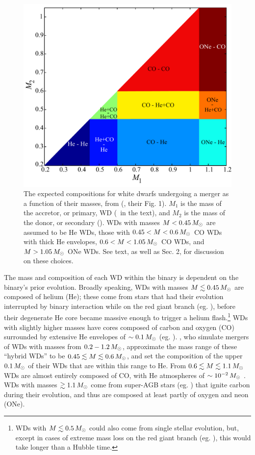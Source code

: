 \begin{figure}
\centering
\includegraphics[width=0.6\hsize]{introduction/figures/dan+12_wdbinmass.pdf}
\caption{The expected compositions for white dwarfs undergoing a merger as a function of their masses, from \citeauthor{dan+12} (\citeyear{dan+12}, their Fig. 1).  $M_1$ is the mass of the accretor, or primary, WD (\Ma\ in the text), and $M_2$ is the mass of the donor, or secondary (\Md).  WDs with masses $M<0.45\,\Msun$ are assumed to be He WDs, those with $0.45 < M < 0.6\,\Msun$ CO WDs with thick He envelopes, $0.6 < M < 1.05\,\Msun$ CO WDs, and $M>1.05\,\Msun$ ONe WDs.  See text, as well as \cite{dan+12} Sec. 2, for discussion on these choices.}
\label{fig:c1_wdbinarymasses}
\end{figure}


The mass and composition of each WD within the binary is dependent on the binary's prior evolution.  Broadly speaking, WDs with masses $M \lesssim 0.45\,\Msun$ are composed of helium (He); these come from stars that had their evolution interrupted by binary interaction while on the red giant branch {\charles (eg. \citealt{mars95, nele+01a, podsrp02, nelsdm04}), before their degenerate He core became massive enough to trigger a helium flash.\footnote{{\charles WDs with $M\lesssim0.5\,\Msun$ could also come from single stellar evolution, but, except in cases of extreme mass loss on the red giant branch (eg. \citealt{kali+07}), this would take longer than a Hubble time.}}  WDs with slightly higher masses have cores composed of carbon and oxygen (CO) surrounded by extensive He envelopes of $\sim0.1\,\Msun$ (eg. \citealt{ibent85, nele+01a, podsrp02}).  \cite{dan+12}, who simulate mergers of WDs with masses from $0.2 - 1.2\,\Msun$, approximate the mass range of these ``hybrid WDs'' to be $0.45 \lesssim M \lesssim 0.6\,\Msun$, and set the composition of the upper $0.1\,\Msun$ of their WDs that are within this range to He.}  From $0.6 \lesssim M \lesssim 1.1\,\Msun$ WDs are almost entirely composed of CO, with He atmospheres of $\sim10^{-2}\,\Msun$ \citep{ibent85}.  WDs with masses $\gtrsim 1.1\,\Msun$ come from super-AGB stars (eg. \citealt{herw05, garc13}) that ignite carbon during their evolution, and thus are composed at least partly of oxygen and neon (ONe).  

